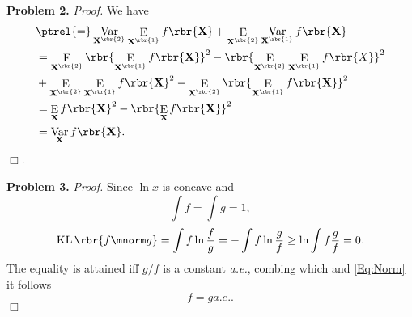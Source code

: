 \documentclass[english, nochinese]{pnote}
\DeclareMathOperator\ope{\mathrm{E}}
\DeclareMathOperator\opvar{\mathrm{Var}}
\DeclareMathOperator\opkl{\mathrm{KL}}
\begin{document}
\textbf{Problem 2.} \textit{Proof.} We have
\begin{equation}
\begin{split}
&\ptrel{=} \opvar_{\mathbf{X}^{\rbr{2}}} \ope_{\mathbf{X}^{\rbr{1}}} f \rbr{\mathbf{X}} + \ope_{\mathbf{X}^{\rbr{2}}} \opvar_{\mathbf{X}^{\rbr{1}}} f \rbr{\mathbf{X}} \\
&= \ope_{\mathbf{X}^{\rbr{2}}} \rbr{ \ope_{\mathbf{X}^{\rbr{1}}} f \rbr{\mathbf{X}} }^2 - \rbr{ \ope_{\mathbf{X}^{\rbr{2}}} \ope_{\mathbf{X}^{\rbr{1}}} f \rbr{X} }^2 \\
&+ \ope_{\mathbf{X}^{\rbr{2}}} \ope_{\mathbf{X}^{\rbr{1}}} f \rbr{\mathbf{X}}^2 - \ope_{\mathbf{X}^{\rbr{2}}} \rbr{ \ope_{\mathbf{X}^{\rbr{1}}} f \rbr{\mathbf{X}} }^2 \\
&= \ope_{\mathbf{X}} f \rbr{\mathbf{X}}^2 - \rbr{ \ope_{\mathbf{X}} f \rbr{\mathbf{X}} }^2 \\
&= \opvar_{\mathbf{X}} f \rbr{\mathbf{X}}.
\end{split}
\end{equation}
\hfill$\Box$.

\textbf{Problem 3.} \textit{Proof.} Since $ \ln x $ is concave and
\begin{equation} \label{Eq:Norm}
\int f = \int g = 1,
\end{equation}
\begin{equation}
\opkl \rbr{ f \mnorm g } = \int f \ln \frac{f}{g} = -\int f \ln \frac{g}{f} \ge \ln \int f \frac{g}{f} = 0.
\end{equation}
The equality is attained iff $ g / f $ is a constant \textit{a.e.}, combing which and \eqref{Eq:Norm} it follows
\begin{equation}
f = g \mathrel{a.e.}.
\end{equation}
\hfill$\Box$
\end{document}
